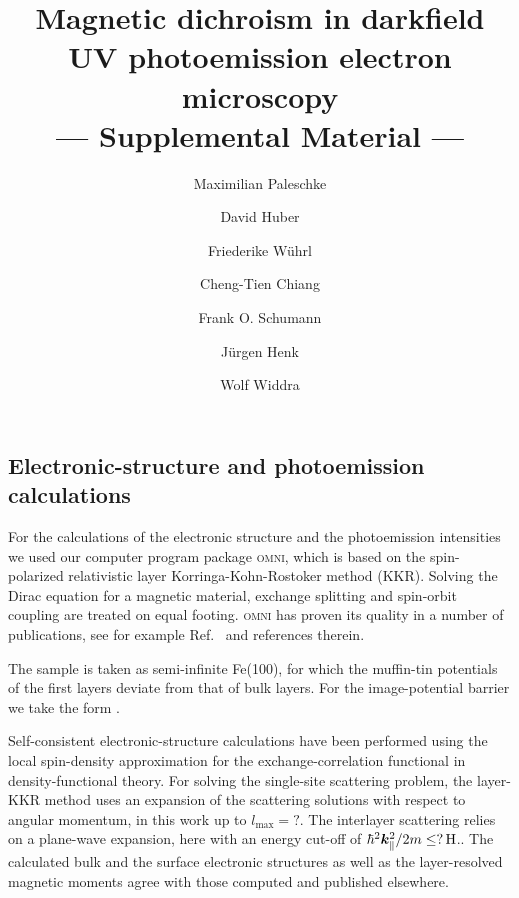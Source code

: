 \documentclass[amsfonts, amssymb, amsmath, preprint, showkeys, twoside, prl, superscriptaddress, aps]{revtex4-2}
\renewcommand{\vec}[1]{\boldsymbol{#1}}
\begin{document}
\begin{sloppy}

\title{Magnetic dichroism in darkfield UV photoemission electron microscopy  \\ --- Supplemental Material ---}

\author{Maximilian Paleschke}
\author{David Huber}
\author{Friederike Wührl}

\author{Cheng-Tien Chiang}

\author{Frank O. Schumann}

\author{Jürgen Henk}
\author{Wolf Widdra}

\maketitle

\section{Electronic-structure and photoemission calculations}
For the calculations of the electronic structure and the photoemission intensities we used our computer program package \textsc{omni}, which is based on the spin-polarized relativistic layer Korringa-Kohn-Rostoker method (KKR). Solving the Dirac equation for a magnetic material, exchange splitting and spin-orbit coupling are treated on equal footing. \textsc{omni} has proven its quality in a number of publications, see for example Ref.~\cite{Tusche2018} and references therein.

The sample is taken as semi-infinite Fe(100), for which the muffin-tin potentials of the first  layers deviate from that of bulk layers.  For the image-potential barrier we take the  form .

Self-consistent electronic-structure calculations have been performed using the local spin-density approximation for the exchange-correlation functional in density-functional theory. For solving the single-site scattering problem, the layer-KKR method uses an expansion of the scattering solutions with respect to angular momentum, in this work up to $l_{\mathrm{max}} = ?$. The interlayer scattering relies on a  plane-wave expansion, here with an energy cut-off of $\hbar^{2}\vec{k}_{\parallel}^{2} / 2 m \leq \unit[?]{H}$.. The calculated bulk and the surface electronic structures as well as the layer-resolved magnetic moments agree with those computed and published elsewhere. 


\end{sloppy}
\end{document}
